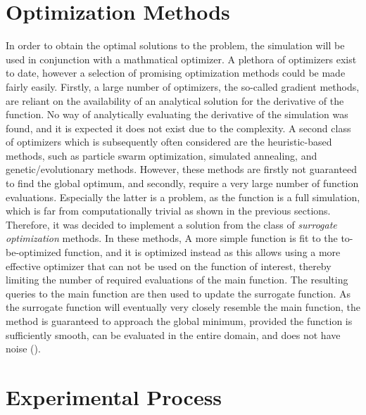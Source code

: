 \section{Optimization Methods}
\label{sec:methdologyoptimization}
In order to obtain the optimal solutions to the problem, the simulation will be used in conjunction with a mathmatical optimizer. A plethora of optimizers exist to date, however a selection of promising optimization methods could be made fairly easily. Firstly, a large number of optimizers, the so-called gradient methods, are reliant on the availability of an analytical solution for the derivative of the function. No way of analytically evaluating the derivative of the simulation was found, and it is expected it does not exist due to the complexity. A second class of optimizers which is subsequently often considered are the heuristic-based methods, such as particle swarm optimization, simulated annealing, and genetic/evolutionary methods. However, these methods are firstly not guaranteed to find the global optimum, and secondly, require a very large number of function evaluations. Especially the latter is a problem, as the function is a full simulation, which is far from computationally trivial as shown in the previous sections. \\

Therefore, it was decided to implement a solution from the class of \textit{surrogate optimization} methods. In these methods, A more simple function is fit to the to-be-optimized function, and it is optimized instead as this allows using a more effective optimizer that can not be used on the function of interest, thereby limiting the number of required evaluations of the main function. The resulting queries to the main function are then used to update the surrogate function. As the surrogate function will eventually very closely resemble the main function, the method is guaranteed to approach the global minimum, provided the function is sufficiently smooth, can be evaluated in the entire domain, and does not have noise (\cite{Surrogate}).

\section{Experimental Process}
\label{sec:methodologyprocess}
